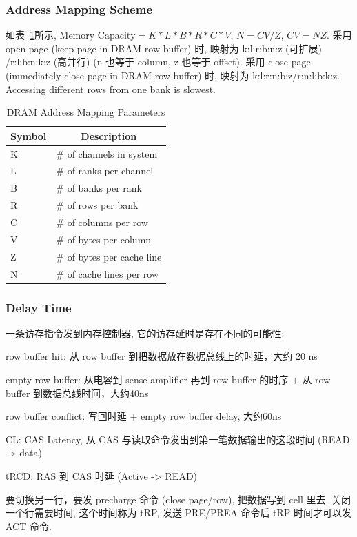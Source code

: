 \documentclass[UTF8,12pt,a4paper]{article}
\begin{document}
\subsubsection{Address Mapping Scheme}
如表~\ref{tab:dram_address_mapping}所示,
$\text{Memory Capacity} = K*L*B*R*C*V$,
$N = CV/Z$, $CV = NZ$.
采用 open page (keep page in DRAM row buffer) 时,
映射为 k:l:r:b:n:z (可扩展) /r:l:b:n:k:z (高并行) (n 也等于 column, z 也等于 offset).
采用 close page (immediately close page in DRAM row buffer) 时,
映射为 k:l:r:n:b:z/r:n:l:b:k:z.
Accessing different rows from one bank is slowest.
\begin{table}
  \begin{small}
    \caption{DRAM Address Mapping Parameters}
    \label{tab:dram_address_mapping}
    \begin{center}
      \begin{tabular}[c]{l|l}
        \hline
        \multicolumn{1}{c|}{\textbf{Symbol}} & 
        \multicolumn{1}{c}{\textbf{Description}} \\
        \hline
        K & \# of channels in system \\
        L & \# of ranks per channel \\
        B & \# of banks per rank \\
        R & \# of rows per bank \\
        C & \# of columns per row \\
        V & \# of bytes per column \\
        Z & \# of bytes per cache line \\
        N & \# of cache lines per row \\
        \hline
      \end{tabular}
    \end{center}
  \end{small}
\end{table}
\subsubsection{Delay Time}
一条访存指令发到内存控制器, 它的访存延时是存在不同的可能性:
\begin{compactitem}
  \item row buffer hit: 从 row buffer 到把数据放在数据总线上的时延，大约 20 ns
  \item empty row buffer: 从电容到 sense amplifier 再到 row buffer 的时序 + 从 row buffer 到数据总线时间，大约40ns
  \item row buffer conflict: 写回时延 + empty row buffer delay, 大约60ns
  \item CL: CAS Latency, 从 CAS 与读取命令发出到第一笔数据输出的这段时间 (READ -> data)
  \item tRCD: RAS 到 CAS 时延 (Active -> READ)
  \item 要切换另一行，要发 precharge 命令 (close page/row), 把数据写到 cell 里去.
  关闭一个行需要时间, 这个时间称为 tRP, 发送 PRE/PREA 命令后 tRP 时间才可以发 ACT 命令.
\end{compactitem}
\end{document}
